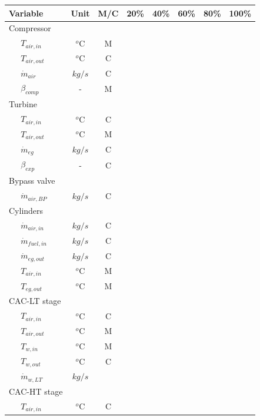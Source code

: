 \documentclass[preprint,12pt]{elsarticle}
\begin{document}
\begin{table}
	\small
	\centering
	\begin{tabular}{llccrrrrr}
		\hline
		\multicolumn{2}{l}{Variable} & Unit & M/C & 20\% & 40\% & 60\% & 80\% & 100\% \\
		\hline
		\multicolumn{2}{l}{Compressor} & & & & & & & \\ 
		& 	$T_{air,in}$  		& $^o$C & M  & &  & & & \\ 
		&	$T_{air,out}$  		& $^o$C & C  & & & & &  \\ 
		&	$\dot{m}_{air}$  	& $kg/s$ & C  & & & & &  \\
		&   $\beta_{comp}$		& - 	& M & & & & &  \\
		\multicolumn{2}{l}{Turbine} & & & & & & &  \\
		&	$T_{air,in}$   		& $^o$C & C  & & & & &  \\ 
		&	$T_{air,out}$  		& $^o$C & M  & & & & &  \\ 
		&	$\dot{m}_{eg}$  	& $kg/s$ & C  & & & & &  \\
		&   $\beta_{exp}$		& - 	& C & & & & &  \\
		\multicolumn{2}{l}{Bypass valve} & & & & & & &  \\
		&	$\dot{m}_{air,BP}$	& $kg/s$ & C  & & & & &  \\ 
		\multicolumn{2}{l}{Cylinders} & & & & & & &   \\
		&	$\dot{m}_{air,in}$  & $kg/s$ & C  & & & & &  \\
		&	$\dot{m}_{fuel,in}$ & $kg/s$ & C  & & & & &  \\
		&	$\dot{m}_{eg,out}$  & $kg/s$ & C  & & & & &  \\
		&	$T_{air,in}$  		& $^o$C & M  & & & & &  \\ 
		&	$T_{eg,out}$  		& $^o$C & M  & & & & &  \\ 
		\multicolumn{2}{l}{CAC-LT stage} & & & & & & &  \\
		&	$T_{air,in}$  		& $^o$C & C  & & & & &  \\ 
		&	$T_{air,out}$ 		& $^o$C & M  & & & & &  \\ 
		&	$T_{w,in}$   		& $^o$C & M  & & & & &  \\ 
		&	$T_{w,out}$   		& $^o$C & C  & & & & &  \\ 
		& 	$\dot{m}_{w,LT}$  	& $kg/s$ & & & & & &  \\
		\multicolumn{2}{l}{CAC-HT stage} & & & & & & & \\
		&	$T_{air,in}$   		& $^o$C & C  & & & & &  \\ 

\end{tabular}
\end{table}
\end{document}
